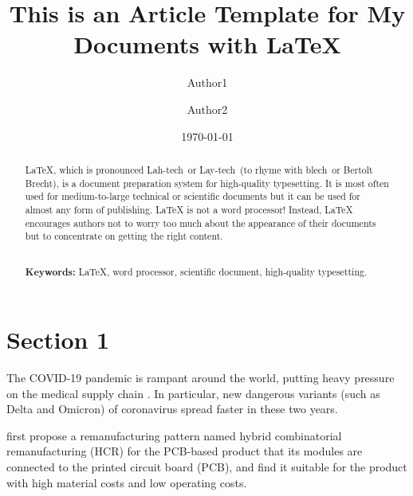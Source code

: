 \documentclass[a4paper,fleqn,11pt]{article}
\begin{document}
\title {This is an Article Template for My Documents with \LaTeX}

\author[a,*]{Author1}
\author[b]{Author2}

\date{\today}     %

\maketitle

\begin{abstract}
	\noindent \LaTeX, which is pronounced \guillemotleft Lah-tech\guillemotright~or \guillemotleft Lay-tech\guillemotright~(to rhyme with \guillemotleft blech\guillemotright~or \guillemotleft Bertolt Brecht\guillemotright), is a document preparation system for high-quality typesetting. It is most often used for medium-to-large technical or scientific documents but it can be used for almost any form of publishing. LaTeX is not a word processor! Instead, LaTeX encourages authors not to worry too much about the appearance of their documents but to concentrate on getting the right content.
	
	~\\

	\noindent\textbf{Keywords:} \LaTeX, word processor, scientific document, high-quality typesetting.
\end{abstract}

\newpage
\thispagestyle{empty} %
\tableofcontents
\thispagestyle{empty} %

\newpage
\section{Section 1}\label{section1}
	
The COVID-19 pandemic is rampant around the world, putting heavy pressure on the medical supply chain \citep{Inderfurth2013}. In particular, new dangerous variants (such as Delta and Omicron) of coronavirus spread faster in these two years. 

\citet{Li2021} first propose a remanufacturing pattern named hybrid combinatorial remanufacturing (HCR) for the PCB-based product that its modules are connected to the printed circuit board (PCB), and find it suitable for the product with high material costs and low operating costs.
	
\end{document}
